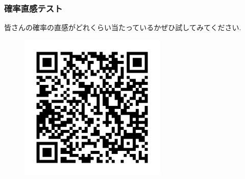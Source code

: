 \documentclass[11pt,dvipdfmx]{beamer}
\theoremstyle{definition}
\theoremstyle{remark}
\begin{document}
\begin{frame}
\frametitle{確率直感テスト}

皆さんの確率の直感がどれくらい当たっているかぜひ試してみてください. 

\begin{figure}[htbp]
\begin{center}
\includegraphics[width=70mm]{prob.png}
\end{center}
\end{figure}
\end{frame}
\end{document}
